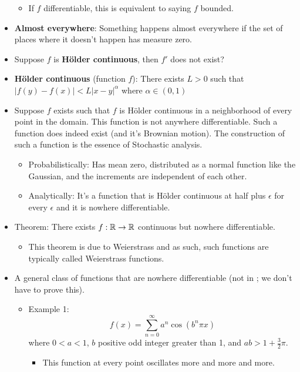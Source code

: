 \documentclass[../../notes.tex]{subfiles}
\begin{document}
\begin{itemize}
    \begin{itemize}
        \item If $f$ differentiable, this is equivalent to saying $f$ bounded.
    \end{itemize}
    \item \textbf{Almost everywhere}: Something happens almost everywhere if the set of places where it doesn't happen has measure zero.
    \item Suppose $f$ is \textbf{H\"{o}lder continuous}, then $f'$ does not exist?
    \item \textbf{H\"{o}lder continuous} (function $f$): There exists $L>0$ such that $|f(y)-f(x)|<L|x-y|^\alpha$ where $\alpha\in(0,1)$
    \item Suppose $f$ exists such that $f$ is H\"{o}lder continuous in a neighborhood of every point in the domain. This function is not anywhere differentiable. Such a function does indeed exist (and it's Brownian motion). The construction of such a function is the essence of Stochastic analysis.
    \begin{itemize}
        \item Probabilistically: Has mean zero, distributed as a normal function like the Gaussian, and the increments are independent of each other.
        \item Analytically: It's a function that is H\"{o}lder continuous at half plus $\epsilon$ for every $\epsilon$ and it is nowhere differentiable.
    \end{itemize}
    \item Theorem: There exists $f:\mathbb{R}\to\mathbb{R}$ continuous but nowhere differentiable.
    \begin{itemize}
        \item This theorem is due to Weierstrass and as such, such functions are typically called Weierstrass functions.
    \end{itemize}
    \item A general class of functions that are nowhere differentiable (not in \textcite{bib:Rudin}; we don't have to prove this).
    \begin{itemize}
        \item Example 1:
        \begin{equation*}
            f(x) = \sum_{n=0}^\infty a^n\cos(b^n\pi x)
        \end{equation*}
        where $0<a<1$, $b$ positive odd integer greater than 1, and $ab>1+\frac{3}{2}\pi$.
        \begin{itemize}
            \item This function at every point oscillates more and more and more.

\end{itemize}
\end{itemize}
\end{itemize}
\end{document}
